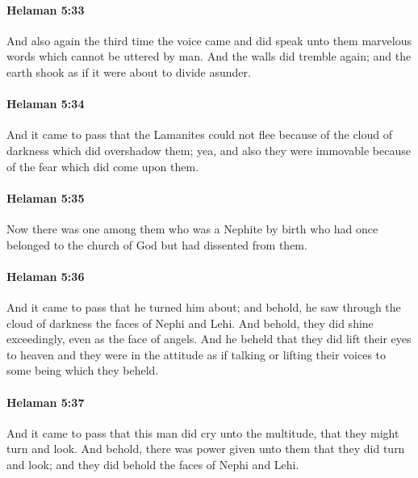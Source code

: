 		\paragraph{Helaman 5:33} %
			\label{HELAMAN-5-33}

			And also again the third time the voice came
			and did speak unto them marvelous words which cannot be uttered by man.
			And the walls did tremble again;
			and the earth shook as if it were about to divide asunder.

		\paragraph{Helaman 5:34} %
			\label{HELAMAN-5-34}

			And it came to pass that the Lamanites could not flee
			because of the cloud of darkness which did overshadow them;
			yea, and also they were immovable
			because of the fear which did come upon them.

		\paragraph{Helaman 5:35} %
			\label{HELAMAN-5-35}

			Now there was one among them
			who was a Nephite by birth
			who had once belonged to the church of God but had dissented from them.

		\paragraph{Helaman 5:36} %
			\label{HELAMAN-5-36}

			And it came to pass that he turned him about;
			and behold, he saw through the cloud of darkness the faces of Nephi and Lehi.
			And behold, they did shine exceedingly, even as the face of angels.
			And he beheld that they did lift their eyes to heaven
			and they were in the attitude as if talking or lifting their voices
			to some being which they beheld.

		\paragraph{Helaman 5:37} %
			\label{HELAMAN-5-37}

			And it came to pass that this man did cry unto the multitude,
			that they might turn and look.
			And behold, there was power given unto them
			that they did turn and look;
			and they did behold the faces of Nephi and Lehi.

